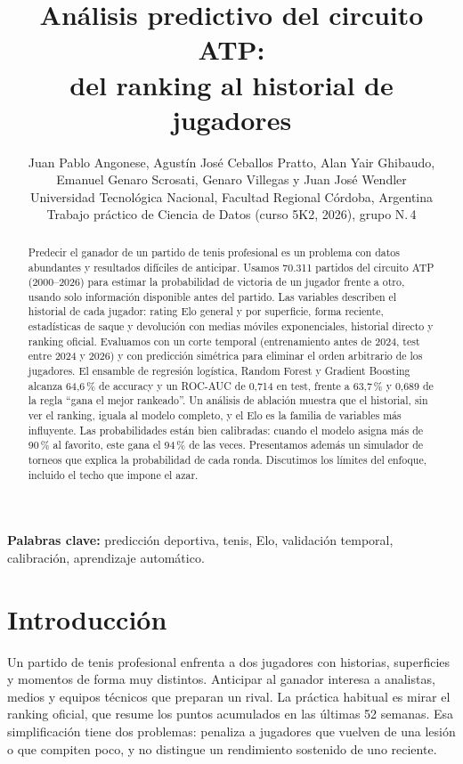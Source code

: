 \documentclass[11pt,a4paper]{article}
\title{\textbf{Análisis predictivo del circuito ATP:\\del ranking al historial de jugadores}}
\author{
  Juan Pablo Angonese, Agustín José Ceballos Pratto, Alan Yair Ghibaudo,\\
  Emanuel Genaro Scrosati, Genaro Villegas y Juan José Wendler\\[4pt]
  \small Universidad Tecnológica Nacional, Facultad Regional Córdoba, Argentina\\
  \small Trabajo práctico de Ciencia de Datos (curso 5K2, 2026), grupo N.\textordmasculine\,4
}
\date{}
\begin{document}
\maketitle

\begin{abstract}
Predecir el ganador de un partido de tenis profesional es un problema con datos abundantes y resultados difíciles de anticipar. Usamos 70.311 partidos del circuito ATP (2000--2026) para estimar la probabilidad de victoria de un jugador frente a otro, usando solo información disponible antes del partido. Las variables describen el historial de cada jugador: rating Elo general y por superficie, forma reciente, estadísticas de saque y devolución con medias móviles exponenciales, historial directo y ranking oficial. Evaluamos con un corte temporal (entrenamiento antes de 2024, test entre 2024 y 2026) y con predicción simétrica para eliminar el orden arbitrario de los jugadores. El ensamble de regresión logística, Random Forest y Gradient Boosting alcanza 64,6\,\% de accuracy y un ROC-AUC de 0,714 en test, frente a 63,7\,\% y 0,689 de la regla ``gana el mejor rankeado''. Un análisis de ablación muestra que el historial, sin ver el ranking, iguala al modelo completo, y el Elo es la familia de variables más influyente. Las probabilidades están bien calibradas: cuando el modelo asigna más de 90\,\% al favorito, este gana el 94\,\% de las veces. Presentamos además un simulador de torneos que explica la probabilidad de cada ronda. Discutimos los límites del enfoque, incluido el techo que impone el azar.
\end{abstract}

\noindent\textbf{Palabras clave:} predicción deportiva, tenis, Elo, validación temporal, calibración, aprendizaje automático.

\section{Introducción}

Un partido de tenis profesional enfrenta a dos jugadores con historias, superficies y momentos de forma muy distintos. Anticipar al ganador interesa a analistas, medios y equipos técnicos que preparan un rival. La práctica habitual es mirar el ranking oficial, que resume los puntos acumulados en las últimas 52 semanas. Esa simplificación tiene dos problemas: penaliza a jugadores que vuelven de una lesión o que compiten poco, y no distingue un rendimiento sostenido de uno reciente.
\end{document}

